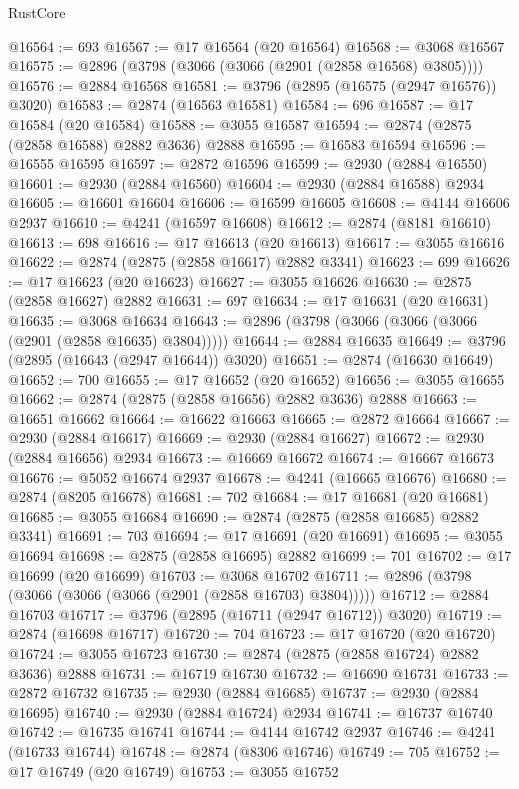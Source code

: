 \begin{lexlean}{RustCore}
\begin{coremodule}
@16564 := 693
@16567 := @17 @16564 (@20 @16564)
@16568 := @3068 @16567
@16575 := @2896 (@3798 (@3066 (@3066 (@2901 (@2858 @16568) @3805))))
@16576 := @2884 @16568
@16581 := @3796 (@2895 (@16575 (@2947 @16576)) @3020)
@16583 := @2874 (@16563 @16581)
@16584 := 696
@16587 := @17 @16584 (@20 @16584)
@16588 := @3055 @16587
@16594 := @2874 (@2875 (@2858 @16588) @2882 @3636) @2888
@16595 := @16583 @16594
@16596 := @16555 @16595
@16597 := @2872 @16596
@16599 := @2930 (@2884 @16550)
@16601 := @2930 (@2884 @16560)
@16604 := @2930 (@2884 @16588) @2934
@16605 := @16601 @16604
@16606 := @16599 @16605
@16608 := @4144 @16606 @2937
@16610 := @4241 (@16597 @16608)
@16612 := @2874 (@8181 @16610)
@16613 := 698
@16616 := @17 @16613 (@20 @16613)
@16617 := @3055 @16616
@16622 := @2874 (@2875 (@2858 @16617) @2882 @3341)
@16623 := 699
@16626 := @17 @16623 (@20 @16623)
@16627 := @3055 @16626
@16630 := @2875 (@2858 @16627) @2882
@16631 := 697
@16634 := @17 @16631 (@20 @16631)
@16635 := @3068 @16634
@16643 := @2896 (@3798 (@3066 (@3066 (@3066 (@2901 (@2858 @16635) @3804)))))
@16644 := @2884 @16635
@16649 := @3796 (@2895 (@16643 (@2947 @16644)) @3020)
@16651 := @2874 (@16630 @16649)
@16652 := 700
@16655 := @17 @16652 (@20 @16652)
@16656 := @3055 @16655
@16662 := @2874 (@2875 (@2858 @16656) @2882 @3636) @2888
@16663 := @16651 @16662
@16664 := @16622 @16663
@16665 := @2872 @16664
@16667 := @2930 (@2884 @16617)
@16669 := @2930 (@2884 @16627)
@16672 := @2930 (@2884 @16656) @2934
@16673 := @16669 @16672
@16674 := @16667 @16673
@16676 := @5052 @16674 @2937
@16678 := @4241 (@16665 @16676)
@16680 := @2874 (@8205 @16678)
@16681 := 702
@16684 := @17 @16681 (@20 @16681)
@16685 := @3055 @16684
@16690 := @2874 (@2875 (@2858 @16685) @2882 @3341)
@16691 := 703
@16694 := @17 @16691 (@20 @16691)
@16695 := @3055 @16694
@16698 := @2875 (@2858 @16695) @2882
@16699 := 701
@16702 := @17 @16699 (@20 @16699)
@16703 := @3068 @16702
@16711 := @2896 (@3798 (@3066 (@3066 (@3066 (@2901 (@2858 @16703) @3804)))))
@16712 := @2884 @16703
@16717 := @3796 (@2895 (@16711 (@2947 @16712)) @3020)
@16719 := @2874 (@16698 @16717)
@16720 := 704
@16723 := @17 @16720 (@20 @16720)
@16724 := @3055 @16723
@16730 := @2874 (@2875 (@2858 @16724) @2882 @3636) @2888
@16731 := @16719 @16730
@16732 := @16690 @16731
@16733 := @2872 @16732
@16735 := @2930 (@2884 @16685)
@16737 := @2930 (@2884 @16695)
@16740 := @2930 (@2884 @16724) @2934
@16741 := @16737 @16740
@16742 := @16735 @16741
@16744 := @4144 @16742 @2937
@16746 := @4241 (@16733 @16744)
@16748 := @2874 (@8306 @16746)
@16749 := 705
@16752 := @17 @16749 (@20 @16749)
@16753 := @3055 @16752

\end{coremodule}
\end{lexlean}
